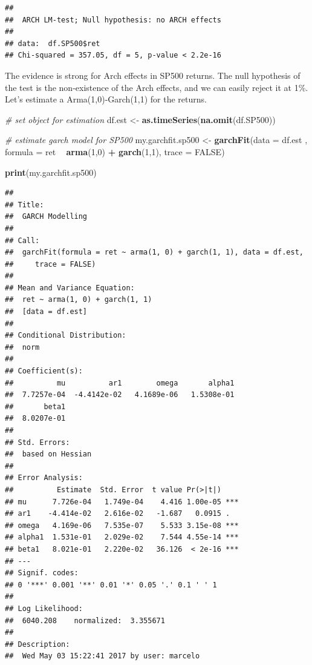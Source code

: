\documentclass[11pt,]{book}
\newenvironment{Shaded}{\begin{snugshade}}{\end{snugshade}}
\newcommand{\KeywordTok}[1]{\textcolor[rgb]{0.27,0.27,0.27}{\textbf{#1}}}
\newcommand{\DataTypeTok}[1]{\textcolor[rgb]{0.27,0.27,0.27}{#1}}
\newcommand{\DecValTok}[1]{\textcolor[rgb]{0.06,0.06,0.06}{#1}}
\newcommand{\StringTok}[1]{\textcolor[rgb]{0.5,0.5,0.5}{#1}}
\newcommand{\CommentTok}[1]{\textcolor[rgb]{0.56,0.35,0.01}{\textit{#1}}}
\newcommand{\OtherTok}[1]{\textcolor[rgb]{0.56,0.35,0.01}{#1}}
\newcommand{\OperatorTok}[1]{\textcolor[rgb]{0.81,0.36,0.00}{\textbf{#1}}}
\newcommand{\NormalTok}[1]{#1}
\begin{document}
\begin{verbatim}
## 
##  ARCH LM-test; Null hypothesis: no ARCH effects
## 
## data:  df.SP500$ret
## Chi-squared = 357.05, df = 5, p-value < 2.2e-16
\end{verbatim}

The evidence is strong for Arch effects in SP500 returns. The null
hypothesis of the test is the non-existence of the Arch effects, and we
can easily reject it at 1\%. Let's estimate a Arma(1,0)-Garch(1,1) for
the returns.

\begin{Shaded}
\begin{Highlighting}[]
\CommentTok{# set object for estimation}
\NormalTok{df.est <-}\StringTok{ }\KeywordTok{as.timeSeries}\NormalTok{(}\KeywordTok{na.omit}\NormalTok{(df.SP500))}

\CommentTok{# estimate garch model for SP500}
\NormalTok{my.garchfit.sp500 <-}\StringTok{ }\KeywordTok{garchFit}\NormalTok{(}\DataTypeTok{data =}\NormalTok{ df.est , }
                              \DataTypeTok{formula =}\NormalTok{ ret }\OperatorTok{~}\StringTok{ }\KeywordTok{arma}\NormalTok{(}\DecValTok{1}\NormalTok{,}\DecValTok{0}\NormalTok{) }\OperatorTok{+}\StringTok{ }\KeywordTok{garch}\NormalTok{(}\DecValTok{1}\NormalTok{,}\DecValTok{1}\NormalTok{), }
                              \DataTypeTok{trace =} \OtherTok{FALSE}\NormalTok{)}

\KeywordTok{print}\NormalTok{(my.garchfit.sp500)}
\end{Highlighting}
\end{Shaded}

\begin{verbatim}
## 
## Title:
##  GARCH Modelling 
## 
## Call:
##  garchFit(formula = ret ~ arma(1, 0) + garch(1, 1), data = df.est, 
##     trace = FALSE) 
## 
## Mean and Variance Equation:
##  ret ~ arma(1, 0) + garch(1, 1)
##  [data = df.est]
## 
## Conditional Distribution:
##  norm 
## 
## Coefficient(s):
##          mu          ar1        omega       alpha1  
##  7.7257e-04  -4.4142e-02   4.1689e-06   1.5308e-01  
##       beta1  
##  8.0207e-01  
## 
## Std. Errors:
##  based on Hessian 
## 
## Error Analysis:
##          Estimate  Std. Error  t value Pr(>|t|)    
## mu      7.726e-04   1.749e-04    4.416 1.00e-05 ***
## ar1    -4.414e-02   2.616e-02   -1.687   0.0915 .  
## omega   4.169e-06   7.535e-07    5.533 3.15e-08 ***
## alpha1  1.531e-01   2.029e-02    7.544 4.55e-14 ***
## beta1   8.021e-01   2.220e-02   36.126  < 2e-16 ***
## ---
## Signif. codes:  
## 0 '***' 0.001 '**' 0.01 '*' 0.05 '.' 0.1 ' ' 1
## 
## Log Likelihood:
##  6040.208    normalized:  3.355671 
## 
## Description:
##  Wed May 03 15:22:41 2017 by user: marcelo
\end{verbatim}
\end{document}
